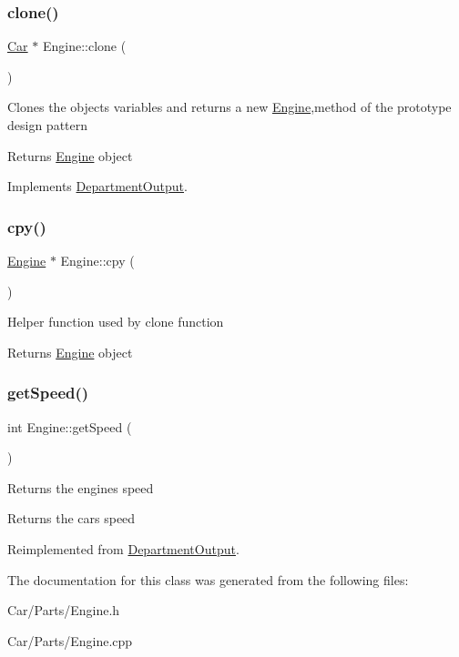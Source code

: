 \subsubsection{\texorpdfstring{clone()}{clone()}}
{\footnotesize\ttfamily \hyperlink{classCar}{Car} $\ast$ Engine\+::clone (\begin{DoxyParamCaption}{ }\end{DoxyParamCaption})\hspace{0.3cm}{\ttfamily [virtual]}}

Clones the objects variables and returns a new \hyperlink{classEngine}{Engine},method of the prototype design pattern \begin{DoxyReturn}{Returns}
\hyperlink{classEngine}{Engine} object 
\end{DoxyReturn}


Implements \hyperlink{classDepartmentOutput_ab20c9d559bca6ce8e6748dfac47c3f84}{Department\+Output}.

\mbox{\label{classEngine_a9cf97e7e9b82db13748a00256c1e4509}} 
\subsubsection{\texorpdfstring{cpy()}{cpy()}}
{\footnotesize\ttfamily \hyperlink{classEngine}{Engine} $\ast$ Engine\+::cpy (\begin{DoxyParamCaption}{ }\end{DoxyParamCaption})}

Helper function used by clone function \begin{DoxyReturn}{Returns}
\hyperlink{classEngine}{Engine} object 
\end{DoxyReturn}
\mbox{\label{classEngine_a5f828ac1355f02d43f8bae90fbddb131}} 
\subsubsection{\texorpdfstring{get\+Speed()}{getSpeed()}}
{\footnotesize\ttfamily int Engine\+::get\+Speed (\begin{DoxyParamCaption}{ }\end{DoxyParamCaption})\hspace{0.3cm}{\ttfamily [virtual]}}

Returns the engines speed \begin{DoxyReturn}{Returns}
the cars speed 
\end{DoxyReturn}


Reimplemented from \hyperlink{classDepartmentOutput_a90caf8934a687d18b9855f19a421ecef}{Department\+Output}.



The documentation for this class was generated from the following files\+:\begin{DoxyCompactItemize}
\item 
Car/\+Parts/Engine.\+h\item 
Car/\+Parts/Engine.\+cpp\end{DoxyCompactItemize}

